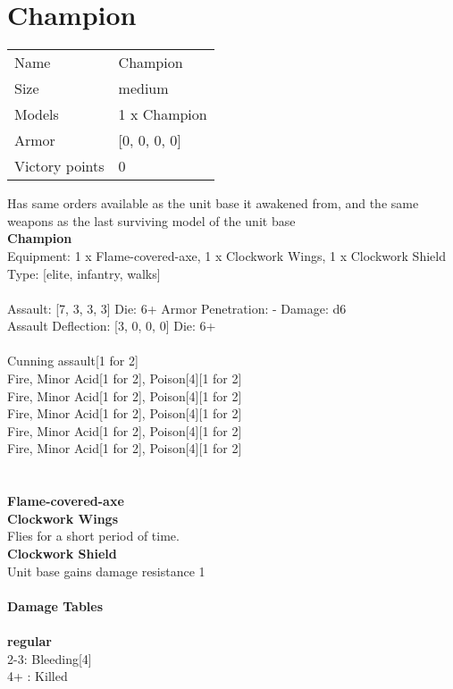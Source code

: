 \pagebreak

\section{ Champion }

\begin{tabular}{ll}
  Name & Champion \\
  Size & medium\\
  Models & 1 x Champion\\
  Armor & [0, 0, 0, 0]\\
  Victory points & 0\\
\end{tabular}

Has same orders available as the unit base it awakened from, and the same weapons as the last surviving model of the unit base\\ 


{\bf Champion } \\
Equipment: 1 x Flame-covered-axe, 1 x Clockwork Wings, 1 x Clockwork Shield \\
Type: [elite, infantry, walks] \\
\ \\
Assault: [7, 3, 3, 3] Die: 6+ Armor Penetration: - Damage: d6 \\
Assault Deflection: [3, 0, 0, 0] Die: 6+\\
\\ 
Cunning assault[1 for 2]\\ 
Fire, Minor Acid[1 for 2], Poison[4][1 for 2]\\ 
Fire, Minor Acid[1 for 2], Poison[4][1 for 2]\\ 
Fire, Minor Acid[1 for 2], Poison[4][1 for 2]\\ 
Fire, Minor Acid[1 for 2], Poison[4][1 for 2]\\ 
Fire, Minor Acid[1 for 2], Poison[4][1 for 2]\\ 
 
\ \\

\ \\
{\bf Flame-covered-axe } \\






{\bf Clockwork Wings } \\

Flies for a short period of time.\\ 





{\bf Clockwork Shield } \\

Unit base gains damage resistance 1\\ 





 
\ \\




{\bf Damage Tables} \\
\ \\ {\bf regular } \\
2-3: Bleeding[4] \\
4+ : Killed \\










